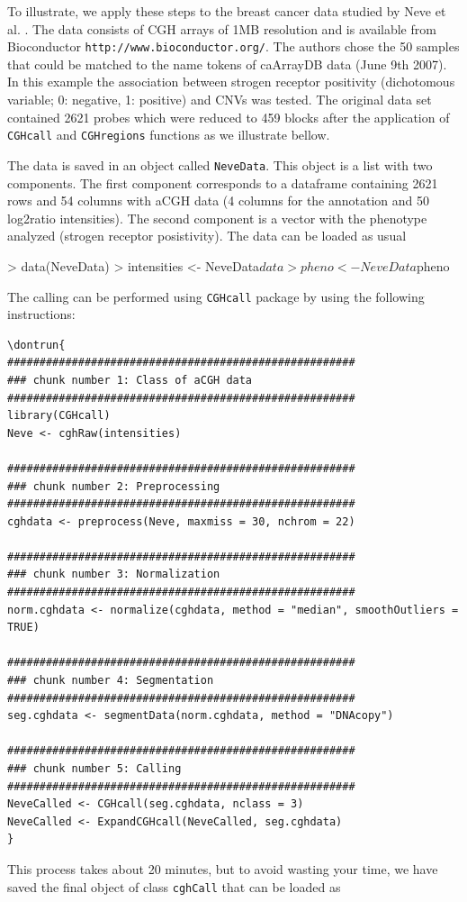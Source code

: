 \documentclass[11pt]{article}
\begin{document}
To illustrate, we apply these steps to the breast cancer data studied by Neve et al. \cite{NevChiFri06}. The data consists of CGH arrays of 
1MB resolution and is available from Bioconductor {\tt http://www.bioconductor.org/}. The authors chose the 50 samples that could 
be matched to the name tokens of caArrayDB data (June 9th 2007). In this example the association between strogen receptor positivity 
(dichotomous variable; 0: negative, 1: positive) and CNVs was tested. The original data set contained 2621 probes which were reduced 
to 459 blocks after the application of {\tt CGHcall} and {\tt CGHregions} functions as we illustrate bellow.

The data is saved in an object called {\tt NeveData}.  This object is a list with two components. The first component corresponds to 
a dataframe containing 2621 rows and 54 columns with aCGH data (4 columns for the annotation and 50 log2ratio intensities). 
The second component is a vector with the phenotype analyzed (strogen receptor posistivity). The data can be loaded as usual

\begin{Schunk}
\begin{Sinput}
> data(NeveData)
> intensities <- NeveData$data
> pheno <- NeveData$pheno
\end{Sinput}
\end{Schunk}

%
The calling can be performed using {\tt CGHcall} package by using the following instructions:
%
\begin{verbatim}
\dontrun{
######################################################
### chunk number 1: Class of aCGH data
######################################################
library(CGHcall)
Neve <- cghRaw(intensities)

######################################################
### chunk number 2: Preprocessing
######################################################
cghdata <- preprocess(Neve, maxmiss = 30, nchrom = 22)

######################################################
### chunk number 3: Normalization
######################################################
norm.cghdata <- normalize(cghdata, method = "median", smoothOutliers = TRUE)

######################################################
### chunk number 4: Segmentation
######################################################
seg.cghdata <- segmentData(norm.cghdata, method = "DNAcopy")

######################################################
### chunk number 5: Calling
######################################################
NeveCalled <- CGHcall(seg.cghdata, nclass = 3)
NeveCalled <- ExpandCGHcall(NeveCalled, seg.cghdata)
}
\end{verbatim}
%
This process takes about 20 minutes, but to avoid wasting your time, we have saved the final object of class {\tt cghCall} that can be loaded as
%
\end{document}
